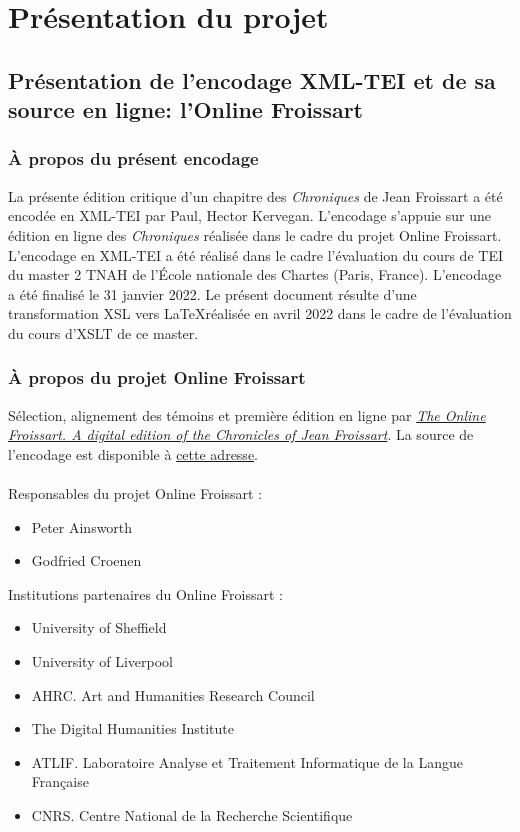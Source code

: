 \documentclass[12pt, a4paper]{article}
\begin{document}
             \section{Présentation du projet} \subsection{Présentation de l'encodage XML-TEI et de sa source en ligne: l'Online Froissart} \subsubsection{À propos du présent encodage} La présente édition critique d'un chapitre des \textit{Chroniques} de Jean Froissart a été encodée en XML-TEI par Paul, Hector Kervegan. L'encodage s'appuie sur une édition en ligne des \textit{Chroniques} réalisée dans le cadre du projet Online Froissart.\\ \indent L'encodage en XML-TEI a été réalisé dans le cadre l'évaluation du cours de TEI du master 2 TNAH de l'École nationale des Chartes (Paris, France). L'encodage a été finalisé le 31 janvier 2022. Le présent document résulte d'une transformation XSL vers \LaTeX réalisée en avril 2022 dans le cadre de l'évaluation du cours d'XSLT de ce master. \subsubsection{À propos du projet Online Froissart} Sélection, alignement des témoins et première édition en ligne par \href{https://www.dhi.ac.uk/onlinefroissart}{\textit{The Online Froissart. A digital edition of the Chronicles of Jean Froissart}}. La source de l'encodage est disponible à \href{https://www.dhi.ac.uk/onlinefroissart/browsey.jsp?f=b&pb2=Ber-3_SHF_3A-307&disp2=shf&GlobalWord=0&div2=ms.f.transc.Ber-3&div1=ms.f.transc.Bre-3&div0=ms.f.transc.Ant-3&panes=3&GlobalMode=shf&img0=&disp0=shf&disp1=shf&pb1=Bre-3_SHF_3A-307&img2=&GlobalShf=3A-306&pb0=Ant-3_SHF_3A-307&img1=}{cette adresse}.\\~\\ \noindent Responsables du projet Online Froissart : \begin{itemize}\item{ Peter Ainsworth } \item{ Godfried Croenen } \end{itemize} \noindent Institutions partenaires du Online Froissart : \begin{itemize}\item{University of Sheffield} \item{University of Liverpool} \item{AHRC. Art and Humanities Research Council} \item{The Digital Humanities Institute} \item{ATLIF. Laboratoire Analyse et Traitement Informatique de la Langue Française} \item{CNRS. Centre National de la Recherche Scientifique} \end{itemize} 
\end{document}
